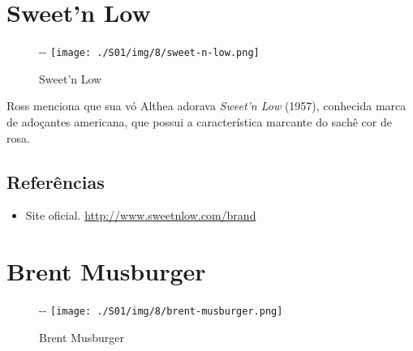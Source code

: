\hypertarget{sweetn-low}{%
\section{Sweet'n Low}\label{sweetn-low}}

\begin{figure}[!ht]
  \begin{adjustwidth}{-\oddsidemargin-1in}{-\rightmargin}
    \centering
    \texttt{[image: ./S01/img/8/sweet-n-low.png]}
    \caption{Sweet’n Low\label{fig:sweet-n-low}}
  \end{adjustwidth}
\end{figure}

Ross menciona que sua vó Althea adorava \emph{Sweet'n Low} (1957),
conhecida marca de adoçantes americana, que possui a característica
marcante do sachê cor de rosa.

\hypertarget{referuxeancias}{%
\subsection{Referências}\label{referuxeancias}}

\begin{itemize}
\tightlist
\item
  \sloppy Site oficial. \url{http://www.sweetnlow.com/brand}
\end{itemize}

\hypertarget{brent-musburger}{%
\section{Brent Musburger}\label{brent-musburger}}

\begin{figure}[!ht]
  \begin{adjustwidth}{-\oddsidemargin-1in}{-\rightmargin}
    \centering
    \texttt{[image: ./S01/img/8/brent-musburger.png]}
    \caption{Brent Musburger\label{fig:brent-musburger}}
  \end{adjustwidth}
\end{figure}

